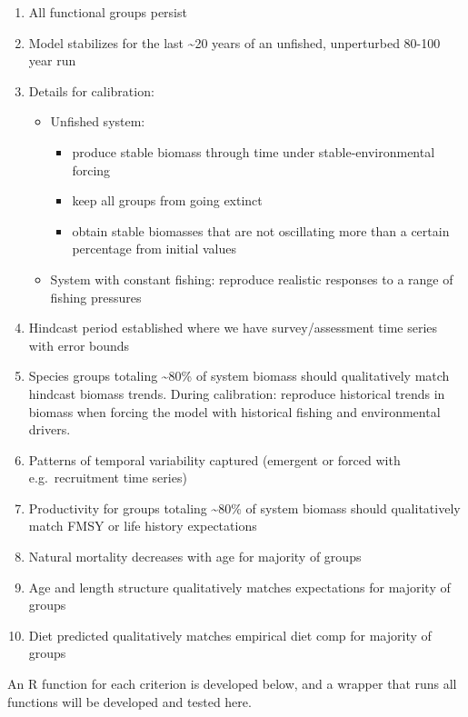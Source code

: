 \documentclass[
]{article}
\providecommand{\tightlist}{%
  \setlength{\itemsep}{0pt}\setlength{\parskip}{0pt}}
\begin{document}
\begin{enumerate}
\def\labelenumi{\arabic{enumi}.}
\item
  All functional groups persist
\item
  Model stabilizes for the last \textasciitilde20 years of an unfished,
  unperturbed 80-100 year run
\item
  Details for calibration:

  \begin{itemize}
  \tightlist
  \item
    Unfished system:

    \begin{itemize}
    \tightlist
    \item
      produce stable biomass through time under stable-environmental
      forcing
    \item
      keep all groups from going extinct
    \item
      obtain stable biomasses that are not oscillating more than a
      certain percentage from initial values
    \end{itemize}
  \item
    System with constant fishing: reproduce realistic responses to a
    range of fishing pressures
  \end{itemize}
\item
  Hindcast period established where we have survey/assessment time
  series with error bounds
\item
  Species groups totaling \textasciitilde80\% of system biomass should
  qualitatively match hindcast biomass trends. During calibration:
  reproduce historical trends in biomass when forcing the model with
  historical fishing and environmental drivers.
\item
  Patterns of temporal variability captured (emergent or forced with
  e.g.~recruitment time series)
\item
  Productivity for groups totaling \textasciitilde80\% of system biomass
  should qualitatively match FMSY or life history expectations
\item
  Natural mortality decreases with age for majority of groups
\item
  Age and length structure qualitatively matches expectations for
  majority of groups
\item
  Diet predicted qualitatively matches empirical diet comp for majority
  of groups
\end{enumerate}

An R function for each criterion is developed below, and a wrapper that
runs all functions will be developed and tested here.
\end{document}
